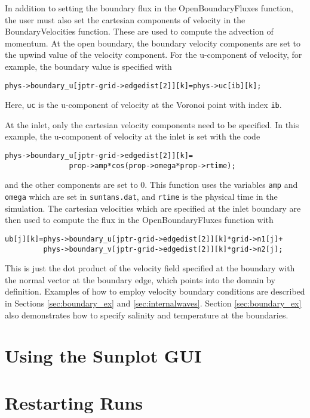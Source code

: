\documentclass[12pt,oneside]{article}
\begin{document}
In addition to setting
the boundary flux in the OpenBoundaryFluxes function, the user must also set the cartesian components
of velocity in the BoundaryVelocities function.  These are used to compute the advection of momentum.
At the open boundary, the boundary velocity components are set to the upwind value of the velocity
component.  For the u-component of velocity, for example, the boundary value is specified
with
\begin{verbatim}
phys->boundary_u[jptr-grid->edgedist[2]][k]=phys->uc[ib][k];
\end{verbatim}
Here, \verb+uc+ is the u-component of velocity at the Voronoi point with index \verb+ib+.

At the inlet, only the cartesian velocity components need to be specified.  In this example,
the u-component of velocity at the inlet is set with the code
\begin{verbatim}
phys->boundary_u[jptr-grid->edgedist[2]][k]=
               prop->amp*cos(prop->omega*prop->rtime);
\end{verbatim}
and the other components are set to 0.  This function uses the variables \verb+amp+ and \verb+omega+
which are set in \verb+suntans.dat+, and \verb+rtime+ is the physical time in the simulation.
The cartesian velocities which are specified at the inlet boundary are then used to compute
the flux in the OpenBoundaryFluxes function with
\begin{verbatim}
ub[j][k]=phys->boundary_u[jptr-grid->edgedist[2]][k]*grid->n1[j]+
         phys->boundary_v[jptr-grid->edgedist[2]][k]*grid->n2[j];
\end{verbatim}
This is just the dot product of the velocity field specified at the boundary with the
normal vector at the boundary edge, which points into the domain by definition.
Examples of how to employ velocity boundary conditions are described in Sections \ref{sec:boundary_ex}
and \ref{sec:internalwaves}.  Section \ref{sec:boundary_ex} also demonstrates 
how to specify salinity and temperature at the boundaries.

\section{Using the Sunplot GUI}

\section{Restarting Runs} \label{sec:restart}
\end{document}
